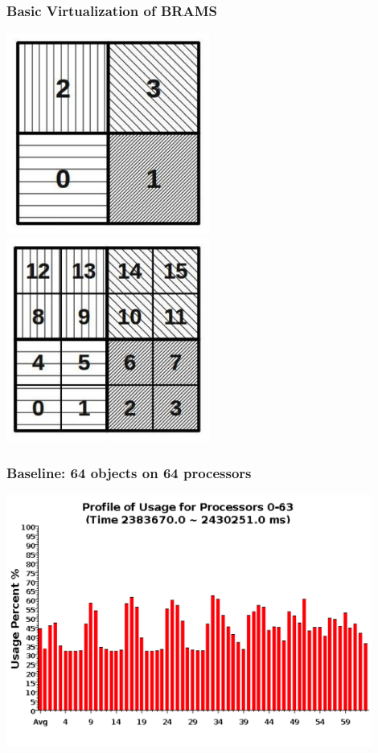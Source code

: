 \begin{frame}[fragile]
\frametitle{Basic Virtualization of BRAMS}
\includegraphics[width=0.5\textwidth]{../figures/bramsNonVirtual.png}
\includegraphics[width=0.5\textwidth]{../figures/bramsVirtual.png}
\end{frame}

\begin{frame}[fragile]
\frametitle{Baseline: 64 objects on 64 processors}
\begin{center}\includegraphics[width=0.9\textwidth]{../figures/usageNonVirtual.png}\end{center}
\end{frame}

